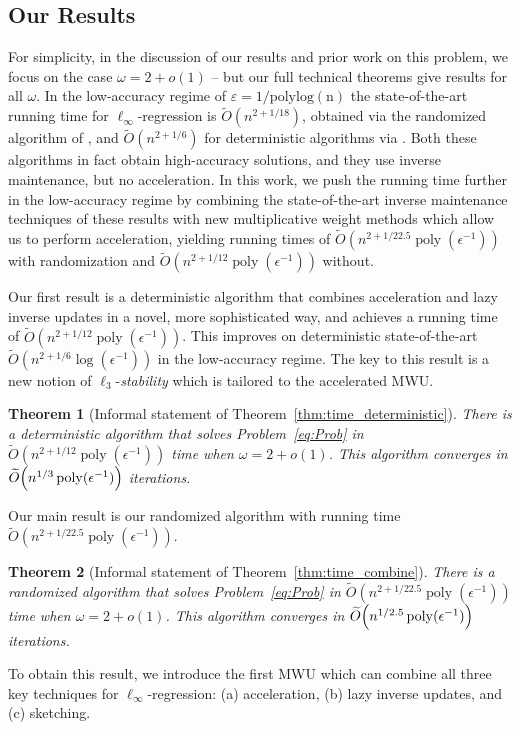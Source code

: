 \documentclass[11pt]{article}
\newtheorem{theorem}{Theorem}[section]
\let\originalleft\left
\let\originalright\right
\renewcommand{\left}{\mathopen{}\mathclose\bgroup\originalleft}
\renewcommand{\right}{\aftergroup\egroup\originalright}
\newcommand\Otil{\widetilde{O}}
\DeclareMathOperator*{\poly}{{\mathrm{poly}}}
\newcommand{\eps}{\varepsilon}
\begin{document}
\subsection{Our Results}
For simplicity, in the discussion of our results and prior work on this problem, we focus on the case $\omega = 2+o(1)$ -- but our full technical theorems give results for all $\omega$.
In the low-accuracy regime of $\eps = 1/\operatorname{polylog(n)}$ 
the state-of-the-art running time for $\ell_\infty$-regression is
$\Otil(n^{2+1/18})$, obtained via the randomized algorithm of \cite{jiang2021faster}, and  $\Otil(n^{2+1/6})$ for deterministic algorithms via \cite{vdB20}.
Both these algorithms in fact obtain high-accuracy solutions, and they use inverse maintenance, but no acceleration.
In this work, we push the running time further in the low-accuracy regime by combining the state-of-the-art inverse
maintenance techniques of these results with new multiplicative weight methods which allow us to perform acceleration, yielding running times of $\Otil(n^{2+1/22.5} \poly(\epsilon^{-1}))$ with randomization and $\Otil(n^{2+1/12}\poly(\epsilon^{-1}))$ without. 

Our first result is a deterministic algorithm that combines acceleration and lazy inverse updates in a novel, more sophisticated way, and achieves a running time of $\Otil(n^{2+1/12}\poly(\epsilon^{-1}))$.
This improves on deterministic state-of-the-art $\Otil(n^{2+1/6}\operatorname{log}(\epsilon^{-1}))$ \cite{vdB20} in the low-accuracy regime.
The key to this result is a new notion of $\ell_3$-\emph{stability} which is tailored to the accelerated MWU.

\begin{theorem}[Informal statement of Theorem~\ref{thm:time_deterministic}]\label{thm:informal_deterministic}
There is a deterministic algorithm that solves Problem~\eqref{eq:Prob} in $\Otil(n^{2+1/12}\poly(\epsilon^{-1}))$ time when $\omega = 2 + o(1)$. This algorithm converges in $\Otil\left(n^{1/3} \poly(\epsilon^{-1})\right)$ iterations.
\end{theorem}
Our main result is our randomized algorithm with running time $\Otil(n^{2+1/22.5}\poly(\epsilon^{-1}))$. 
\begin{theorem}[Informal statement of Theorem~\ref{thm:time_combine}]\label{thm:informal_random}
There is a randomized algorithm that solves Problem~\eqref{eq:Prob} in $\Otil(n^{2+1/22.5}\poly(\epsilon^{-1}))$ time when $\omega = 2 + o(1)$. This algorithm converges in $\Otil\left(n^{1/2.5}\poly(\epsilon^{-1})\right)$ iterations.
\end{theorem}
To obtain this result, we introduce the first MWU which can combine all three key techniques for $\ell_\infty$-regression: (a) acceleration, (b) lazy inverse updates, and (c) sketching.
\end{document}
